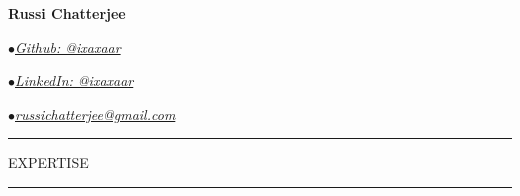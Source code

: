 \documentclass[10pt]{article} %
\newcommand\textbox[1]{%
  \parbox{.333\textwidth}{#1}%
}
\begin{document}
\begin{center}
\Huge\textbf{Russi Chatterjee}
\end{center}

\noindent\textbox{$\bullet$\href{https://github.com/ixaxaar}{\textit{\textcolor{RoyalPurple}{Github: @ixaxaar}}}\hfill}\textbox{\hfil$\bullet$\href{http://in.linkedin.com/in/ixaxaar/}{\textit{\textcolor{RoyalPurple}{LinkedIn: @ixaxaar}}}\hfil}\textbox{\hfill$\bullet$\href{mailto:russichatterjee@gmail.com}{\textit{\textcolor{RoyalPurple}{russichatterjee@gmail.com}}}}
\newline
\newline


\noindent\textcolor{Apricot}{\rule{17cm}{1.8pt}}

\newline

\noindent\large{EXPERTISE}

\noindent\textcolor{Apricot}{\rule{17cm}{1.8pt}}
\end{document}
